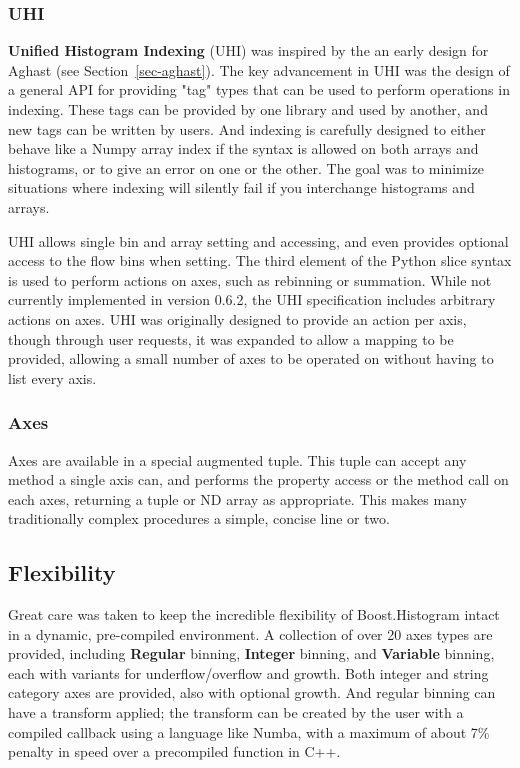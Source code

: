\documentclass{webofc}
\begin{document}
\subsubsection{UHI}
\label{sec-bhp-uhi}

\textbf{Unified Histogram Indexing} (UHI) was inspired by the an early design for Aghast (see Section~\ref{sec-aghast}). The key advancement in UHI was the design of a general API for providing "tag" types that can be used to perform operations in indexing. These tags can be provided by one library and used by another, and new tags can be written by users. And indexing is carefully designed to either behave like a Numpy array index if the syntax is allowed on both arrays and histograms, or to give an error on one or the other. The goal was to minimize situations where indexing will silently fail if you interchange histograms and arrays.

UHI allows single bin and array setting and accessing, and even provides optional access to the flow bins when setting. The third element of the Python slice syntax is used to perform actions on axes, such as rebinning or summation. While not currently implemented in version 0.6.2, the UHI specification includes arbitrary actions on axes. UHI was originally designed to provide an action per axis, though through user requests, it was expanded to allow a mapping to be provided, allowing a small number of axes to be operated on without having to list every axis.

\subsubsection{Axes}
\label{sec-bhp-axes}

Axes are available in a special augmented tuple. This tuple can accept any method a single axis can, and performs the property access or the method call on each axes, returning a tuple or ND array as appropriate. This makes many traditionally complex procedures a simple, concise line or two.

\subsection{Flexibility}

Great care was taken to keep the incredible flexibility of Boost.Histogram intact in a dynamic, pre-compiled environment. A collection of over 20 axes types are provided, including \textbf{Regular} binning, \textbf{Integer} binning, and \textbf{Variable} binning, each with variants for underflow/overflow and growth. Both integer and string category axes are provided, also with optional growth. And regular binning can have a transform applied; the transform can be created by the user with a compiled callback using a language like Numba, with a maximum of about 7\% penalty in speed over a precompiled function in C++.
\end{document}
